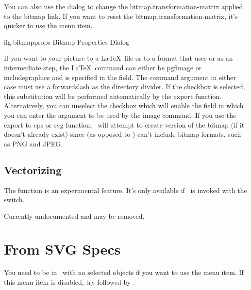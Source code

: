 You can also use the  dialog to change the
\gls{bitmap.transformation-matrix} applied to the bitmap link.
If you want to reset the \gls{bitmap.transformation-matrix}, it's
quicker to use the  menu item.

\FloatFig
 {fig:bitmapprops}
 {}
 {Bitmap Properties Dialog}

If you want to  your picture to a \LaTeX\ file or
to a format that uses  or  as an intermediate
step, the \LaTeX\ command can either be \gls{pgfimage} or
\gls{includegraphics} and is specified in the
 field. The command argument in
either case must use a \gls{forwardslash} as the directory divider. If
the  \gls*{checkbox}
is selected, this substitution will be performed automatically by
the export function. Alternatively, you can unselect
the  \gls*{checkbox}
which will enable the
 field in which you
can enter the argument to be used by the image command. If you use the
export to \gls{eps} or \gls{svg} function, \FlowframTk\ will
attempt to create  version of the bitmap (if it doesn't
already exist) since  (as opposed to
) can't include bitmap formats, such as PNG and
JPEG.


\subsection{Vectorizing}\label{sec:vectorize}

The  function is an experimental
feature. It's only available if \FlowframTk\ is invoked with
the  switch.

Currently undocumented and may be removed.


\section{From SVG Specs}\label{sec:newfromsvg}

You need to be in \selectmode\ with no selected
\glspl{object} if you want to use the  menu
item. If this menu item is disabled, try 
followed by .


